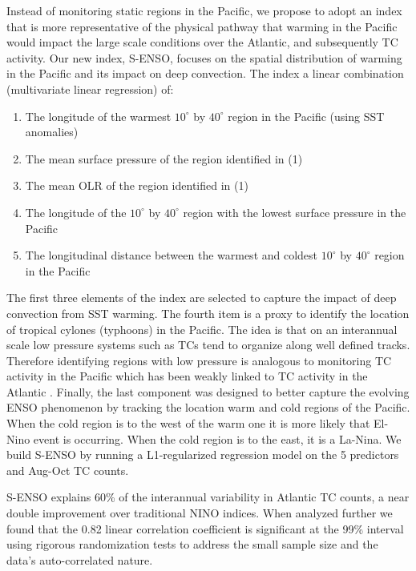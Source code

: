 \documentclass[]{article}
\begin{document}
Instead of monitoring static regions in the Pacific, we propose to adopt an index that is more representative of the physical pathway that warming in the Pacific would impact the large scale conditions over the Atlantic, and subsequently TC activity. Our new index, S-ENSO, focuses on the spatial distribution of warming in the Pacific and its impact on deep convection. The index a linear combination (multivariate linear regression) of:
\begin{enumerate}

	\item The longitude of the warmest $10^\circ$ by $40^\circ$ region in the Pacific (using SST anomalies)

	\item The mean surface pressure of the region identified in (1)

	\item The mean OLR of the region identified in (1)

	\item The longitude of the $10^\circ$ by $40^\circ$ region with the lowest surface pressure in the Pacific

	\item The longitudinal distance between the warmest and coldest $10^\circ$ by $40^\circ$ region in the Pacific
\end{enumerate}
The first three elements of the index are selected to capture the impact of deep convection from SST warming. The fourth item is a proxy to identify the location of tropical cylones (typhoons) in the Pacific. The idea is that on an interannual scale low pressure systems such as TCs tend to organize along well defined tracks. Therefore identifying regions with low pressure is analogous to monitoring TC activity in the Pacific which has been weakly linked to TC activity in the Atlantic \cite{wang2010}. Finally, the last component was designed to better capture the evolving ENSO phenomenon by tracking the location warm and cold regions of the Pacific. When the cold region is to the west of the warm one it is more likely that El-Nino event is occurring. When the cold region is to the east, it is a La-Nina. We build S-ENSO by running a L1-regularized regression model on the 5 predictors and Aug-Oct TC counts.

S-ENSO explains 60\% of the interannual variability in Atlantic TC counts, a near double improvement over traditional NINO indices. When analyzed further we found that the 0.82 linear correlation coefficient is significant at the 99\% interval using rigorous randomization tests to address the small sample size and the data's auto-correlated nature.
\end{document}
